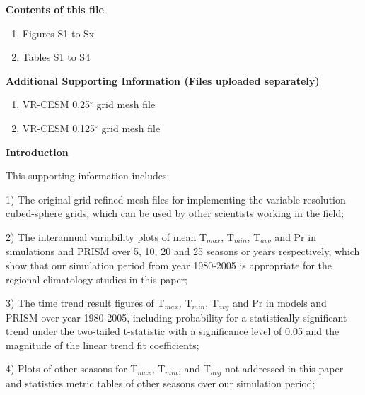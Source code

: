 \documentclass[ms]{agutexSI}
\begin{document}
\begin{article}

%
%



\noindent\textbf{Contents of this file}
\begin{enumerate}
\item Figures S1 to Sx
\item Tables S1 to S4
\end{enumerate}
\noindent\textbf{Additional Supporting Information (Files uploaded separately)}
\begin{enumerate}
\item VR-CESM 0.25$^\circ$ grid mesh file
\item VR-CESM 0.125$^\circ$ grid mesh file
\end{enumerate}

\noindent\textbf{Introduction}

This supporting information includes:

1) The original grid-refined mesh files for implementing the variable-resolution cubed-sphere grids, which can be used by other scientists working in the field;

2) The interannual variability plots of mean T$_{max}$, T$_{min}$, T$_{avg}$ and Pr in simulations and PRISM over 5, 10, 20 and 25 seasons or years respectively, which show that our simulation period from year 1980-2005 is appropriate for the regional climatology studies in this paper;

3) The time trend result figures of T$_{max}$, T$_{min}$, T$_{avg}$ and Pr in models and PRISM over year 1980-2005, including probability for a statistically significant trend under the two-tailed t-statistic with a significance level of 0.05 and the magnitude of the linear trend fit coefficients;

4) Plots of other seasons for T$_{max}$, T$_{min}$, and T$_{avg}$ not addressed in this paper and statistics metric tables of other seasons over our simulation period;


\end{article}
\end{document}
